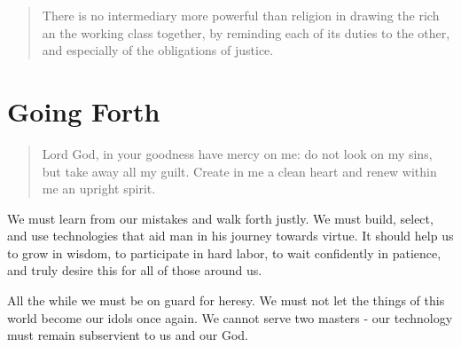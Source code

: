 \documentclass[letterpaper]{article}
\begin{document}
\begin{quote}
  There is no intermediary more powerful than religion in drawing the rich an the working class together, by reminding each of its duties to the other, and especially of the obligations of justice.
\end{quote}

\hfill

\hfill

\hfill

\hfill

\hfill

\hfill

\hfill

\hfill

\hfill

\section{Going Forth}

\begin{quote}
  Lord God, in your goodness have mercy on me: do not look on my sins, but take away all my guilt. Create in me a clean heart and renew within me an upright spirit.
\end{quote}

We must learn from our mistakes and walk forth justly. We must build, select, and use technologies that aid man in his journey towards virtue. It should help us to grow in wisdom, to participate in hard labor, to wait confidently in patience, and truly desire this for all of those around us.

All the while we must be on guard for heresy. We must not let the things of this world become our idols once again. We cannot serve two masters - our technology must remain subservient to us and our God.
\end{document}
